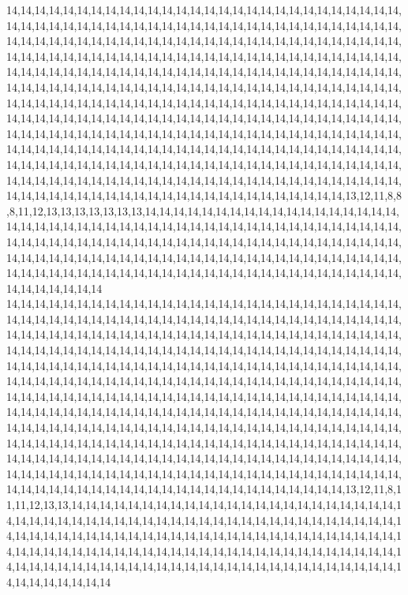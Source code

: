 14,14,14,14,14,14,14,14,14,14,14,14,14,14,14,14,14,14,14,14,14,14,14,14,14,14,14,14,14,14,14,14,14,14,14,14,14,14,14,14,14,14,14,14,14,14,14,14,14,14,14,14,14,14,14,14,14,14,14,14,14,14,14,14,14,14,14,14,14,14,14,14,14,14,14,14,14,14,14,14,14,14,14,14,14,14,14,14,14,14,14,14,14,14,14,14,14,14,14,14,14,14,14,14,14,14,14,14,14,14,14,14,14,14,14,14,14,14,14,14,14,14,14,14,14,14,14,14,14,14,14,14,14,14,14,14,14,14,14,14,14,14,14,14,14,14,14,14,14,14,14,14,14,14,14,14,14,14,14,14,14,14,14,14,14,14,14,14,14,14,14,14,14,14,14,14,14,14,14,14,14,14,14,14,14,14,14,14,14,14,14,14,14,14,14,14,14,14,14,14,14,14,14,14,14,14,14,14,14,14,14,14,14,14,14,14,14,14,14,14,14,14,14,14,14,14,14,14,14,14,14,14,14,14,14,14,14,14,14,14,14,14,14,14,14,14,14,14,14,14,14,14,14,14,14,14,14,14,14,14,14,14,14,14,14,14,14,14,14,14,14,14,14,14,14,14,14,14,14,14,14,14,14,14,14,14,14,14,14,14,14,14,14,14,14,14,14,14,14,14,14,14,14,14,14,14,14,14,14,14,14,14,14,14,14,14,14,14,14,14,14,14,14,14,14,14,14,14,14,14,14,14,14,14,14,14,14,14,14,14,14,14,14,14,14,14,14,14,14,14,14,14,14,14,14,14,14,14,14,14,13,12,11,8,8,8,11,12,13,13,13,13,13,13,13,14,14,14,14,14,14,14,14,14,14,14,14,14,14,14,14,14,14,14,14,14,14,14,14,14,14,14,14,14,14,14,14,14,14,14,14,14,14,14,14,14,14,14,14,14,14,14,14,14,14,14,14,14,14,14,14,14,14,14,14,14,14,14,14,14,14,14,14,14,14,14,14,14,14,14,14,14,14,14,14,14,14,14,14,14,14,14,14,14,14,14,14,14,14,14,14,14,14,14,14,14,14,14,14,14,14,14,14,14,14,14,14,14,14,14,14,14,14,14,14,14,14,14,14,14,14,14,14,14,14,14,14,14,14,14,14,14
14,14,14,14,14,14,14,14,14,14,14,14,14,14,14,14,14,14,14,14,14,14,14,14,14,14,14,14,14,14,14,14,14,14,14,14,14,14,14,14,14,14,14,14,14,14,14,14,14,14,14,14,14,14,14,14,14,14,14,14,14,14,14,14,14,14,14,14,14,14,14,14,14,14,14,14,14,14,14,14,14,14,14,14,14,14,14,14,14,14,14,14,14,14,14,14,14,14,14,14,14,14,14,14,14,14,14,14,14,14,14,14,14,14,14,14,14,14,14,14,14,14,14,14,14,14,14,14,14,14,14,14,14,14,14,14,14,14,14,14,14,14,14,14,14,14,14,14,14,14,14,14,14,14,14,14,14,14,14,14,14,14,14,14,14,14,14,14,14,14,14,14,14,14,14,14,14,14,14,14,14,14,14,14,14,14,14,14,14,14,14,14,14,14,14,14,14,14,14,14,14,14,14,14,14,14,14,14,14,14,14,14,14,14,14,14,14,14,14,14,14,14,14,14,14,14,14,14,14,14,14,14,14,14,14,14,14,14,14,14,14,14,14,14,14,14,14,14,14,14,14,14,14,14,14,14,14,14,14,14,14,14,14,14,14,14,14,14,14,14,14,14,14,14,14,14,14,14,14,14,14,14,14,14,14,14,14,14,14,14,14,14,14,14,14,14,14,14,14,14,14,14,14,14,14,14,14,14,14,14,14,14,14,14,14,14,14,14,14,14,14,14,14,14,14,14,14,14,14,14,14,14,14,14,14,14,14,14,14,14,14,14,14,14,14,14,14,14,14,14,14,14,14,14,14,14,14,14,14,14,13,12,11,8,11,11,12,13,13,14,14,14,14,14,14,14,14,14,14,14,14,14,14,14,14,14,14,14,14,14,14,14,14,14,14,14,14,14,14,14,14,14,14,14,14,14,14,14,14,14,14,14,14,14,14,14,14,14,14,14,14,14,14,14,14,14,14,14,14,14,14,14,14,14,14,14,14,14,14,14,14,14,14,14,14,14,14,14,14,14,14,14,14,14,14,14,14,14,14,14,14,14,14,14,14,14,14,14,14,14,14,14,14,14,14,14,14,14,14,14,14,14,14,14,14,14,14,14,14,14,14,14,14,14,14,14,14,14,14,14,14,14,14,14,14,14,14,14,14,14,14,14
